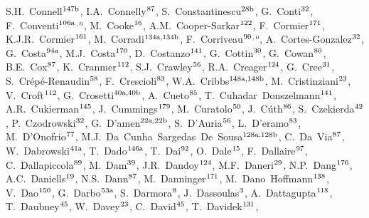 \begin{flushleft}
S.H.~Connell$^\textrm{\scriptsize 147b}$,
I.A.~Connelly$^\textrm{\scriptsize 87}$,
S.~Constantinescu$^\textrm{\scriptsize 28b}$,
G.~Conti$^\textrm{\scriptsize 32}$,
F.~Conventi$^\textrm{\scriptsize 106a}$$^{,n}$,
M.~Cooke$^\textrm{\scriptsize 16}$,
A.M.~Cooper-Sarkar$^\textrm{\scriptsize 122}$,
F.~Cormier$^\textrm{\scriptsize 171}$,
K.J.R.~Cormier$^\textrm{\scriptsize 161}$,
M.~Corradi$^\textrm{\scriptsize 134a,134b}$,
F.~Corriveau$^\textrm{\scriptsize 90}$$^{,o}$,
A.~Cortes-Gonzalez$^\textrm{\scriptsize 32}$,
G.~Costa$^\textrm{\scriptsize 94a}$,
M.J.~Costa$^\textrm{\scriptsize 170}$,
D.~Costanzo$^\textrm{\scriptsize 141}$,
G.~Cottin$^\textrm{\scriptsize 30}$,
G.~Cowan$^\textrm{\scriptsize 80}$,
B.E.~Cox$^\textrm{\scriptsize 87}$,
K.~Cranmer$^\textrm{\scriptsize 112}$,
S.J.~Crawley$^\textrm{\scriptsize 56}$,
R.A.~Creager$^\textrm{\scriptsize 124}$,
G.~Cree$^\textrm{\scriptsize 31}$,
S.~Cr\'ep\'e-Renaudin$^\textrm{\scriptsize 58}$,
F.~Crescioli$^\textrm{\scriptsize 83}$,
W.A.~Cribbs$^\textrm{\scriptsize 148a,148b}$,
M.~Cristinziani$^\textrm{\scriptsize 23}$,
V.~Croft$^\textrm{\scriptsize 112}$,
G.~Crosetti$^\textrm{\scriptsize 40a,40b}$,
A.~Cueto$^\textrm{\scriptsize 85}$,
T.~Cuhadar~Donszelmann$^\textrm{\scriptsize 141}$,
A.R.~Cukierman$^\textrm{\scriptsize 145}$,
J.~Cummings$^\textrm{\scriptsize 179}$,
M.~Curatolo$^\textrm{\scriptsize 50}$,
J.~C\'uth$^\textrm{\scriptsize 86}$,
S.~Czekierda$^\textrm{\scriptsize 42}$,
P.~Czodrowski$^\textrm{\scriptsize 32}$,
G.~D'amen$^\textrm{\scriptsize 22a,22b}$,
S.~D'Auria$^\textrm{\scriptsize 56}$,
L.~D'eramo$^\textrm{\scriptsize 83}$,
M.~D'Onofrio$^\textrm{\scriptsize 77}$,
M.J.~Da~Cunha~Sargedas~De~Sousa$^\textrm{\scriptsize 128a,128b}$,
C.~Da~Via$^\textrm{\scriptsize 87}$,
W.~Dabrowski$^\textrm{\scriptsize 41a}$,
T.~Dado$^\textrm{\scriptsize 146a}$,
T.~Dai$^\textrm{\scriptsize 92}$,
O.~Dale$^\textrm{\scriptsize 15}$,
F.~Dallaire$^\textrm{\scriptsize 97}$,
C.~Dallapiccola$^\textrm{\scriptsize 89}$,
M.~Dam$^\textrm{\scriptsize 39}$,
J.R.~Dandoy$^\textrm{\scriptsize 124}$,
M.F.~Daneri$^\textrm{\scriptsize 29}$,
N.P.~Dang$^\textrm{\scriptsize 176}$,
A.C.~Daniells$^\textrm{\scriptsize 19}$,
N.S.~Dann$^\textrm{\scriptsize 87}$,
M.~Danninger$^\textrm{\scriptsize 171}$,
M.~Dano~Hoffmann$^\textrm{\scriptsize 138}$,
V.~Dao$^\textrm{\scriptsize 150}$,
G.~Darbo$^\textrm{\scriptsize 53a}$,
S.~Darmora$^\textrm{\scriptsize 8}$,
J.~Dassoulas$^\textrm{\scriptsize 3}$,
A.~Dattagupta$^\textrm{\scriptsize 118}$,
T.~Daubney$^\textrm{\scriptsize 45}$,
W.~Davey$^\textrm{\scriptsize 23}$,
C.~David$^\textrm{\scriptsize 45}$,
T.~Davidek$^\textrm{\scriptsize 131}$,

\end{flushleft}
